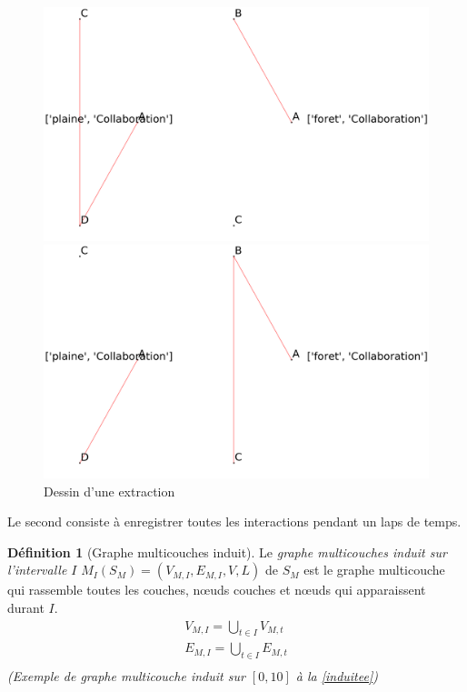 \documentclass[11pt,a4paper]{article}
\theoremstyle{definition}
\newtheorem{defn}{Définition}
\theoremstyle{remark}
\theoremstyle{remark}
\def \stgm {stream graph multicouches}
\begin{document}
	\begin{figure}[H]
		\begin{minipage}{0.45\linewidth}
			\captionsetup{margin=10pt}
			\includegraphics[width=\textwidth]{extrt4ex.png}
			\caption{Extraction du \stgm{} de la \cref{exstgm} au temps $t=4$}
		\end{minipage}
		\begin{minipage}{0.45\linewidth}
			\captionsetup{margin=10pt}
			\includegraphics[width=\textwidth]{extrt7ex.png}
			\caption{Extraction du \stgm{} de la \cref{exstgm} au temps $t=7$}
		\end{minipage}
		\caption{Dessin d'une extraction}
		\label{tempst}
	\end{figure}

    Le second consiste à \og enregistrer \fg{} toutes les interactions pendant un laps de temps.
    \begin{defn}[Graphe multicouches induit]
    Le {\em graphe multicouches induit sur l'intervalle $I$} $M_I(S_M) = (V_{M,I}, E_{M,I}, V,L)$ de $S_M$ est le graphe multicouche qui rassemble toutes les couches, n\oe{}uds couches et n\oe{}uds qui apparaissent durant $I$.
    \begin{align*}
    	V_{M,I} = \bigcup_{t\in I} V_{M,t}\\
    	E_{M,I} = \bigcup_{t\in I} E_{M,t}\\
    \end{align*}
    \textit{(Exemple de graphe multicouche induit sur $[0,10]$ à la \cref{induitee})}
    \end{defn}
    
\end{document}
